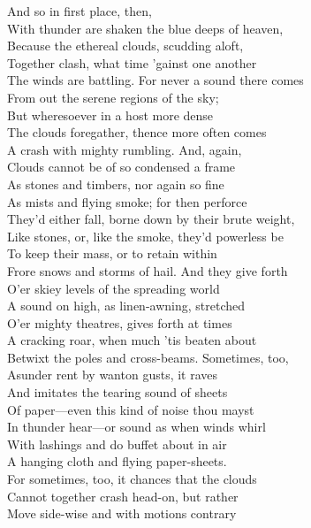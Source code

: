 
And so in first place, then,\\
With thunder are shaken the blue deeps of heaven,\\
Because the ethereal clouds, scudding aloft,\\
Together clash, what time 'gainst one another\\
The winds are battling. For never a sound there comes\\
From out the serene regions of the sky;\\
But wheresoever in a host more dense\\
The clouds foregather, thence more often comes\\
A crash with mighty rumbling. And, again,\\
Clouds cannot be of so condensed a frame\\
As stones and timbers, nor again so fine\\
As mists and flying smoke; for then perforce\\
They'd either fall, borne down by their brute weight,\\
Like stones, or, like the smoke, they'd powerless be\\
To keep their mass, or to retain within\\
Frore snows and storms of hail. And they give forth\\
O'er skiey levels of the spreading world\\
A sound on high, as linen-awning, stretched\\
O'er mighty theatres, gives forth at times\\
A cracking roar, when much 'tis beaten about\\
Betwixt the poles and cross-beams. Sometimes, too,\\
Asunder rent by wanton gusts, it raves\\
And imitates the tearing sound of sheets\\
Of paper—even this kind of noise thou mayst\\
In thunder hear—or sound as when winds whirl\\
With lashings and do buffet about in air\\
A hanging cloth and flying paper-sheets.\\
For sometimes, too, it chances that the clouds\\
Cannot together crash head-on, but rather\\
Move side-wise and with motions contrary\\

